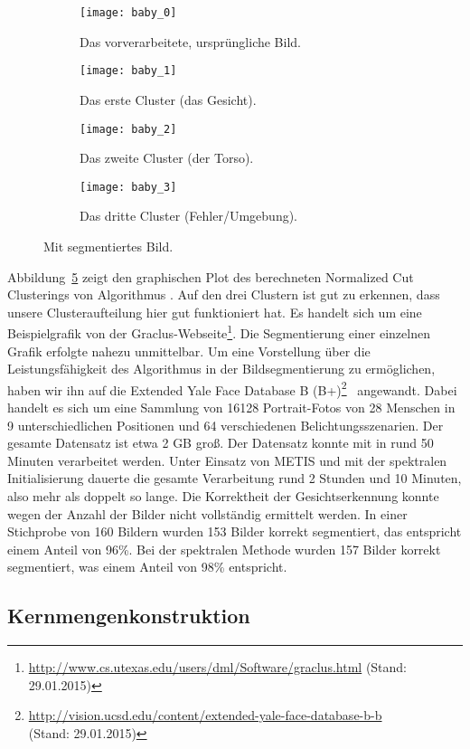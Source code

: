 \begin{figure}[t]
        \centering
        \begin{subfigure}[b]{0.5\textwidth}
        		\centering
                \texttt{[image: baby\_0]}
                \caption{Das vorverarbeitete, ursprüngliche Bild.}
                \label{fig:imageseg-kkmpp-k-3-a}
        \end{subfigure}%
        \begin{subfigure}[b]{0.5\textwidth}
        		\centering
                \texttt{[image: baby\_1]}
                \caption{Das erste Cluster (das Gesicht).}
                \label{fig:imageseg-kkmpp-k-3-b}
        \end{subfigure}
        \begin{subfigure}[b]{0.5\textwidth}
        		\centering
                \texttt{[image: baby\_2]}
                \caption{Das zweite Cluster (der Torso).}
                \label{fig:imageseg-kkmpp-k-3-c}
        \end{subfigure}%
        \begin{subfigure}[b]{0.5\textwidth}
        		\centering
                \texttt{[image: baby\_3]}
                \caption{Das dritte Cluster (Fehler/Umgebung).}
                \label{fig:imageseg-kkmpp-k-3-d}
        \end{subfigure}
\caption{Mit \kkmpp{} segmentiertes Bild.}
\label{fig:imageseg-kkmpp}
\end{figure}
Abbildung~\ref{fig:imageseg-kkmpp} zeigt den graphischen Plot des berechneten Normalized Cut Clusterings von
Algorithmus \kkmpp. Auf den drei Clustern ist gut zu erkennen, dass unsere Clusteraufteilung hier gut funktioniert hat. Es
handelt sich um eine Beispielgrafik von der
Graclus-Webseite\footnote{\url{http://www.cs.utexas.edu/users/dml/Software/graclus.html} (Stand: 29.01.2015)}.
\absatz
Die Segmentierung einer einzelnen Grafik erfolgte nahezu unmittelbar. Um eine Vorstellung über die Leistungsfähigkeit des
Algorithmus in der Bildsegmentierung zu ermöglichen, haben wir ihn auf die
Extended Yale Face Database B (B+)\footnote{\url{http://vision.ucsd.edu/content/extended-yale-face-database-b-b}\\
(Stand: 29.01.2015)}~\cite{GeorghiadesBK01} angewandt. Dabei handelt es sich um eine Sammlung von 16128 Portrait-Fotos von
28 Menschen in 9 unterschiedlichen Positionen und 64 verschiedenen Belichtungsszenarien. Der gesamte Datensatz ist etwa
2 GB groß. Der Datensatz konnte mit \kkmpp{} in rund 50 Minuten verarbeitet werden. Unter Einsatz von METIS und mit
der spektralen Initialisierung dauerte die gesamte Verarbeitung rund 2 Stunden und 10 Minuten, also mehr als doppelt so lange.
Die Korrektheit der Gesichtserkennung konnte wegen der Anzahl der Bilder nicht vollständig ermittelt werden. In einer
Stichprobe von 160 Bildern wurden 153 Bilder korrekt segmentiert, das entspricht einem Anteil von 96\%. Bei der spektralen
Methode wurden 157 Bilder korrekt segmentiert, was einem Anteil von 98\% entspricht.

\subsection{Kernmengenkonstruktion}
\label{subsection:experiment-coreset}